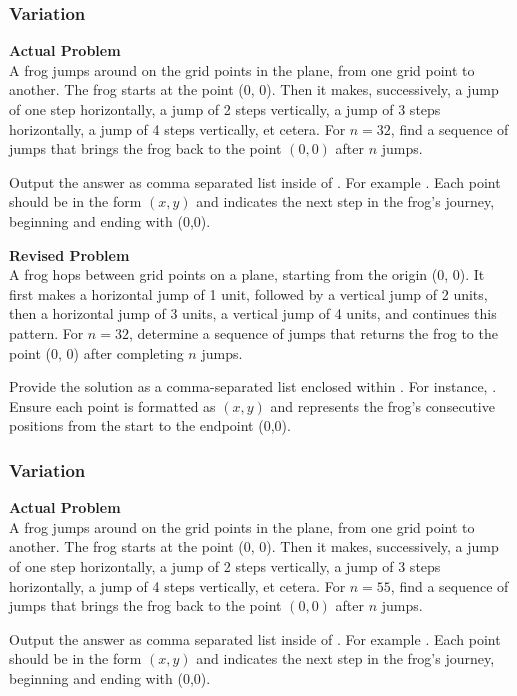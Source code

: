\subsubsection{Variation}
\textbf{Actual Problem}\\
A frog jumps around on the grid points in the plane, from one grid point to another. The frog starts at the point (0, 0). Then it makes, successively, a jump of one step horizontally, a jump of 2 steps vertically, a jump of 3 steps horizontally, a jump of 4 steps vertically, et cetera. For $n = 32$, find a sequence of jumps that brings the frog back to the point $(0, 0)$ after $n$ jumps.

Output the answer as comma separated list inside of . For example . Each point should be in the form $(x, y)$ and indicates the next step in the frog's journey, beginning and ending with (0,0).

\textbf{Revised Problem}\\
A frog hops between grid points on a plane, starting from the origin (0, 0). It first makes a horizontal jump of 1 unit, followed by a vertical jump of 2 units, then a horizontal jump of 3 units, a vertical jump of 4 units, and continues this pattern. For $n = 32$, determine a sequence of jumps that returns the frog to the point (0, 0) after completing $n$ jumps.

Provide the solution as a comma-separated list enclosed within . For instance, . Ensure each point is formatted as $(x, y)$ and represents the frog's consecutive positions from the start to the endpoint (0,0).

\subsubsection{Variation}
\textbf{Actual Problem}\\
A frog jumps around on the grid points in the plane, from one grid point to another. The frog starts at the point (0, 0). Then it makes, successively, a jump of one step horizontally, a jump of 2 steps vertically, a jump of 3 steps horizontally, a jump of 4 steps vertically, et cetera. For $n = 55$, find a sequence of jumps that brings the frog back to the point $(0, 0)$ after $n$ jumps.

Output the answer as comma separated list inside of . For example . Each point should be in the form $(x, y)$ and indicates the next step in the frog's journey, beginning and ending with (0,0).

